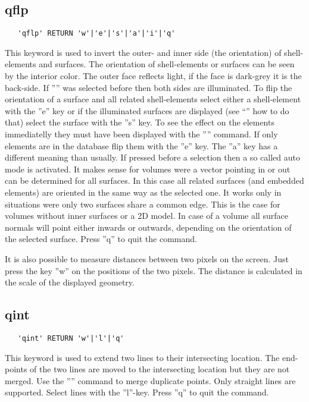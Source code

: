 \documentclass{article}
\begin{document}
\subsection{\label{qflp}qflp}
\begin{verbatim}
   'qflp' RETURN 'w'|'e'|'s'|'a'|'i'|'q'
\end{verbatim}
This keyword is used to invert the outer- and inner side (the orientation) of shell-elements and surfaces. The orientation of shell-elements or surfaces can be seen by the interior color. The outer face reflects light, if the face is dark-grey it is the back-side. If '''' was selected before then both sides are illuminated. To flip the orientation of a surface and all related shell-elements select either a shell-element with the ''e'' key or if the illuminated surfaces are displayed (see ``'' how to do that) select the surface with the ''s'' key. To see the effect on the elements immediatelly they must have been displayed with the '''' command. If only elements are in the database flip them with the ''e'' key. The ''a'' key has a different meaning than usually. If pressed before a selection then a so called auto mode is activated. It makes sense for volumes were a vector pointing in or out can be determined for all surfaces. In this case all related surfaces (and embedded elements) are oriented in the same way as the selected one. It works only in situations were only two surfaces share a common edge. This is the case for volumes without inner surfaces or a 2D model. In case of a volume all surface normals will point either inwards or outwards, depending on the orientation of the selected surface. Press ''q'' to quit the command. 

It is also possible to measure distances between two pixels on the screen. Just press the key ''w'' on the positions of the two pixels. The distance is calculated in the scale of the displayed geometry.

\subsection{\label{qint}qint}
\begin{verbatim}
   'qint' RETURN 'w'|'l'|'q'
\end{verbatim}
This keyword is used to extend two lines to their intersecting location. The end-points of the two lines are moved to the intersecting location but they are not merged. Use the '''' command to merge duplicate points. Only straight lines are supported. Select lines with the ''l''-key. Press ''q'' to quit the command.
\end{document}
